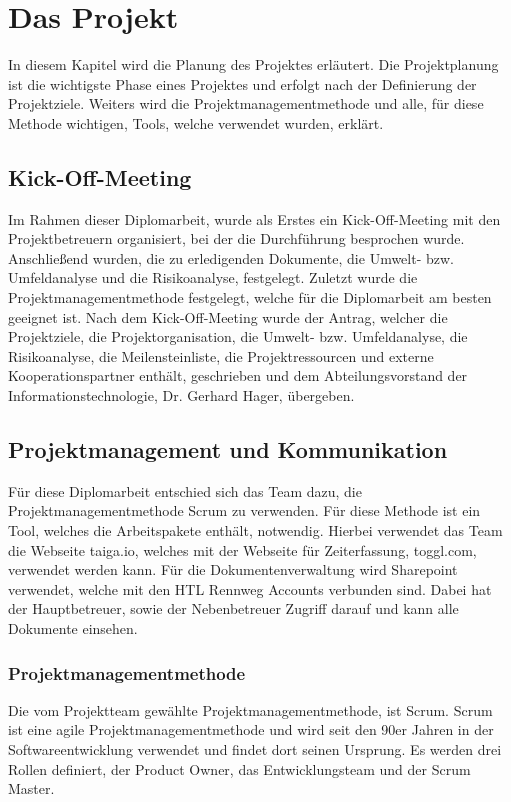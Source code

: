 \chapter{Das Projekt}
\renewcommand{\kapitelautor}{Autor: Hatice Akyokus}
In diesem Kapitel wird die Planung des Projektes erläutert. Die Projektplanung ist die wichtigste Phase eines Projektes und erfolgt nach der Definierung der Projektziele.   Weiters wird die Projektmanagementmethode und alle, für diese Methode wichtigen, Tools, welche verwendet wurden, erklärt.

\section{Kick-Off-Meeting}

Im Rahmen dieser Diplomarbeit, wurde als Erstes ein Kick-Off-Meeting mit den Projektbetreuern organisiert, bei der die Durchführung besprochen wurde. Anschließend wurden, die zu erledigenden Dokumente, die Umwelt- bzw. Umfeldanalyse und die Risikoanalyse, festgelegt. Zuletzt wurde die Projektmanagementmethode festgelegt, welche für die Diplomarbeit am besten geeignet ist. Nach dem Kick-Off-Meeting wurde der Antrag, welcher die Projektziele, die Projektorganisation, die Umwelt- bzw. Umfeldanalyse, die Risikoanalyse, die Meilensteinliste, die Projektressourcen und externe Kooperationspartner enthält, geschrieben und dem Abteilungsvorstand der Informationstechnologie, Dr. Gerhard Hager, übergeben.

\section{Projektmanagement und Kommunikation}

Für diese Diplomarbeit entschied sich das Team dazu, die Projektmanagementmethode Scrum zu verwenden. Für diese Methode ist ein Tool, welches die Arbeitspakete enthält, notwendig. Hierbei verwendet das Team die Webseite taiga.io, welches mit der Webseite für Zeiterfassung, toggl.com, verwendet werden kann. Für die Dokumentenverwaltung wird Sharepoint verwendet, welche mit den HTL Rennweg Accounts verbunden sind. Dabei hat der Hauptbetreuer, sowie der Nebenbetreuer Zugriff darauf und kann alle Dokumente einsehen.

\subsection{Projektmanagementmethode} 

Die vom Projektteam gewählte Projektmanagementmethode, ist Scrum. Scrum ist eine agile Projektmanagementmethode und wird seit den 90er Jahren in der Softwareentwicklung verwendet und findet dort seinen Ursprung. Es werden drei Rollen definiert, der Product Owner, das Entwicklungsteam und der Scrum Master. 

